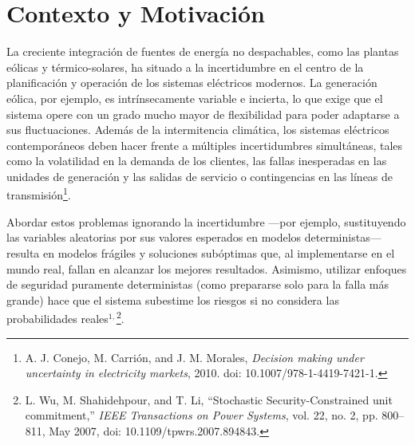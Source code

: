 \documentclass[
	spanish, %
	letterpaper, oneside
]{article}
\begin{document}
\templatePagecfg





\section{Contexto y Motivación}

La creciente integración de fuentes de energía no despachables, como las plantas eólicas y térmico-solares, ha situado a la incertidumbre en el centro de la planificación y operación de los sistemas eléctricos modernos. La generación eólica, por ejemplo, es intrínsecamente variable e incierta, lo que exige que el sistema opere con un grado mucho mayor de flexibilidad para poder adaptarse a sus fluctuaciones. Además de la intermitencia climática, los sistemas eléctricos contemporáneos deben hacer frente a múltiples incertidumbres simultáneas, tales como la volatilidad en la demanda de los clientes, las fallas inesperadas en las unidades de generación y las salidas de servicio o contingencias en las líneas de transmisión\footnote{A. J. Conejo, M. Carrión, and J. M. Morales, \textit{Decision making under uncertainty in electricity markets}, 2010. doi: 10.1007/978-1-4419-7421-1.}.

Abordar estos problemas ignorando la incertidumbre —por ejemplo, sustituyendo las variables aleatorias por sus valores esperados en modelos deterministas— resulta en modelos frágiles y soluciones subóptimas que, al implementarse en el mundo real, fallan en alcanzar los mejores resultados. Asimismo, utilizar enfoques de seguridad puramente deterministas (como prepararse solo para la falla más grande) hace que el sistema subestime los riesgos si no considera las probabilidades reales$^{1,}$\footnote{L. Wu, M. Shahidehpour, and T. Li, ``Stochastic Security-Constrained unit commitment,'' \textit{IEEE Transactions on Power Systems}, vol. 22, no. 2, pp. 800–811, May 2007, doi: 10.1109/tpwrs.2007.894843.}.
\end{document}
